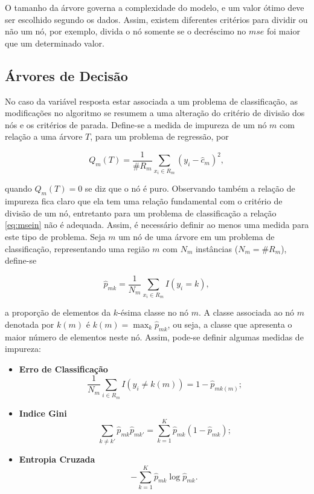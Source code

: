 O tamanho da árvore governa a complexidade do modelo, e um valor ótimo deve ser escolhido segundo os dados. Assim, existem diferentes critérios para dividir ou não um nó, por exemplo, divida o nó somente se o decréscimo no $mse$ foi maior que um determinado valor.

\subsection{Árvores de Decisão}

No caso da variável resposta estar associada a um problema de classificação, as modificações no algoritmo se resumem a uma alteração do critério de divisão dos nós e os critérios de parada. Define-se a medida de impureza de um nó $m$ com relação a uma árvore $T$, para um problema de regressão, por

\begin{equation}\label{eq:msein}
Q_m(T)=\frac{1}{\#R_m}\sum_{x_i\in{R_m}}(y_i-\hat{c}_m)^2\mbox{,}~
\end{equation}

quando $Q_m(T)=0$ se diz que o nó é puro. Observando também a relação de impureza fica claro que ela tem uma relação fundamental com o critério de divisão de um nó, entretanto para um problema de classificação a relação \eqref{eq:msein} não é adequada. Assim, é necessário definir ao menos uma medida para este tipo de problema. Seja $m$ um nó de uma árvore em um problema de classificação, representando uma região $m$ com $N_m$ instâncias ($N_m=\#R_m$), define-se

\begin{equation}
\hat{p}_{mk}=\frac{1}{N_m}\sum_{x_i\in{R_m}}I(y_i=k)\mbox{,}~
\end{equation}

a proporção de elementos da $k$-ésima classe no nó $m$. A classe associada ao nó $m$ denotada por $k(m)$ é $k(m)=\max_k\hat{p}_{mk}$, ou seja, a classe que apresenta o maior número de elementos neste nó. Assim, pode-se definir algumas medidas de impureza:

\begin{itemize}
\item {\bf Erro de Classificação}
\begin{equation}
\frac{1}{N_m}\sum_{i\in{R_m}}I(y_i\neq{k}(m))=1-\hat{p}_{mk(m)}\mbox{;}
\end{equation}
\item {\bf Indice Gini}
\begin{equation}
\sum_{k\neq{k}'}\hat{p}_{mk}\hat{p}_{mk'}=\sum_{k=1}^{K}\hat{p}_{mk}(1-\hat{p}_{mk})\mbox{;}
\end{equation}
\item {\bf Entropia Cruzada}
\begin{equation}
-\sum_{k=1}^K\hat{p}_{mk}\log\hat{p}_{mk}\mbox{.}
\end{equation}
\end{itemize}

